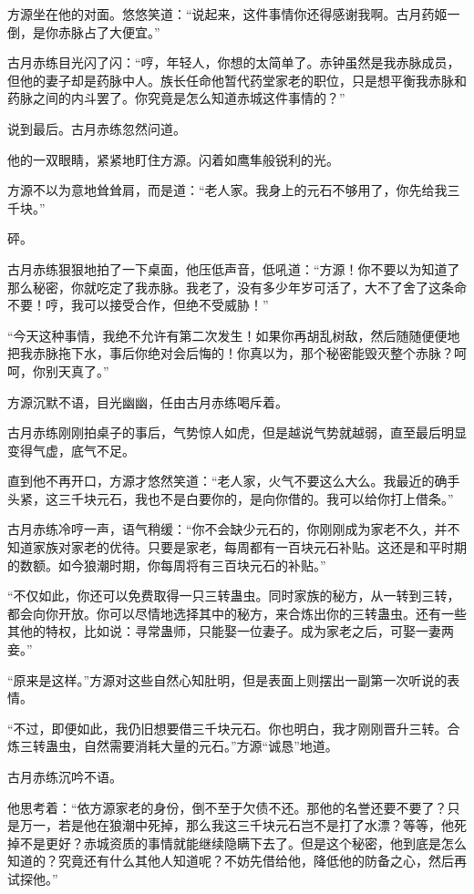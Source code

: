 \begin{this_body}
方源坐在他的对面。悠悠笑道：“说起来，这件事情你还得感谢我啊。古月药姬一倒，是你赤脉占了大便宜。”

古月赤练目光闪了闪：“哼，年轻人，你想的太简单了。赤钟虽然是我赤脉成员，但他的妻子却是药脉中人。族长任命他暂代药堂家老的职位，只是想平衡我赤脉和药脉之间的内斗罢了。你究竟是怎么知道赤城这件事情的？”

说到最后。古月赤练忽然问道。

他的一双眼睛，紧紧地盯住方源。闪着如鹰隼般锐利的光。

方源不以为意地耸耸肩，而是道：“老人家。我身上的元石不够用了，你先给我三千块。”

砰。

古月赤练狠狠地拍了一下桌面，他压低声音，低吼道：“方源！你不要以为知道了那么秘密，你就吃定了我赤脉。我老了，没有多少年岁可活了，大不了舍了这条命不要！哼，我可以接受合作，但绝不受威胁！”

“今天这种事情，我绝不允许有第二次发生！如果你再胡乱树敌，然后随随便便地把我赤脉拖下水，事后你绝对会后悔的！你真以为，那个秘密能毁灭整个赤脉？呵呵，你别天真了。”

方源沉默不语，目光幽幽，任由古月赤练喝斥着。

古月赤练刚刚拍桌子的事后，气势惊人如虎，但是越说气势就越弱，直至最后明显变得气虚，底气不足。

直到他不再开口，方源才悠然笑道：“老人家，火气不要这么大么。我最近的确手头紧，这三千块元石，我也不是白要你的，是向你借的。我可以给你打上借条。”

古月赤练冷哼一声，语气稍缓：“你不会缺少元石的，你刚刚成为家老不久，并不知道家族对家老的优待。只要是家老，每周都有一百块元石补贴。这还是和平时期的数额。如今狼潮时期，你每周将有三百块元石的补贴。”

“不仅如此，你还可以免费取得一只三转蛊虫。同时家族的秘方，从一转到三转，都会向你开放。你可以尽情地选择其中的秘方，来合炼出你的三转蛊虫。还有一些其他的特权，比如说：寻常蛊师，只能娶一位妻子。成为家老之后，可娶一妻两妾。”

“原来是这样。”方源对这些自然心知肚明，但是表面上则摆出一副第一次听说的表情。

“不过，即便如此，我仍旧想要借三千块元石。你也明白，我才刚刚晋升三转。合炼三转蛊虫，自然需要消耗大量的元石。”方源“诚恳”地道。

古月赤练沉吟不语。

他思考着：“依方源家老的身份，倒不至于欠债不还。那他的名誉还要不要了？只是万一，若是他在狼潮中死掉，那么我这三千块元石岂不是打了水漂？等等，他死掉不是更好？赤城资质的事情就能继续隐瞒下去了。但是这个秘密，他到底是怎么知道的？究竟还有什么其他人知道呢？不妨先借给他，降低他的防备之心，然后再试探他。”


\end{this_body}
